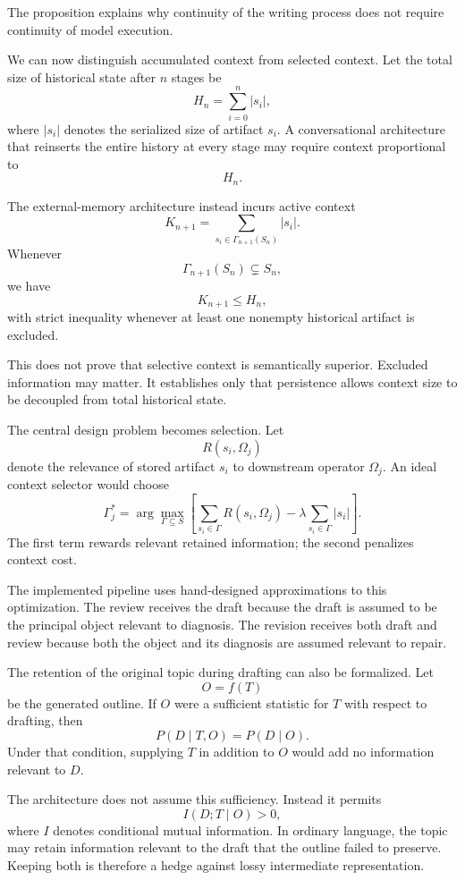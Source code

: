 \documentclass[11pt]{article}
\begin{document}
The proposition explains why continuity of the writing process does not require continuity of model execution.

We can now distinguish accumulated context from selected context. Let the total size of historical state after \(n\) stages be
\[
    H_n=\sum_{i=0}^{n}|s_i|,
\]
where \(|s_i|\) denotes the serialized size of artifact \(s_i\). A conversational architecture that reinserts the entire history at every stage may require context proportional to
\[
    H_n.
\]

The external-memory architecture instead incurs active context
\[
    K_{n+1}
    =
    \sum_{s_i\in\Gamma_{n+1}(S_n)}
    |s_i|.
\]
Whenever
\[
    \Gamma_{n+1}(S_n)\subsetneq S_n,
\]
we have
\[
    K_{n+1}\leq H_n,
\]
with strict inequality whenever at least one nonempty historical artifact is excluded.

This does not prove that selective context is semantically superior. Excluded information may matter. It establishes only that persistence allows context size to be decoupled from total historical state.

The central design problem becomes selection. Let
\[
    R(s_i,\Omega_j)
\]
denote the relevance of stored artifact \(s_i\) to downstream operator \(\Omega_j\). An ideal context selector would choose
\[
    \Gamma_j^\ast
    =
    \arg\max_{\Gamma\subseteq S}
    \left[
        \sum_{s_i\in\Gamma}
        R(s_i,\Omega_j)
        -
        \lambda
        \sum_{s_i\in\Gamma}|s_i|
    \right].
\]
The first term rewards relevant retained information; the second penalizes context cost.

The implemented pipeline uses hand-designed approximations to this optimization. The review receives the draft because the draft is assumed to be the principal object relevant to diagnosis. The revision receives both draft and review because both the object and its diagnosis are assumed relevant to repair.

The retention of the original topic during drafting can also be formalized. Let
\[
    O=f(T)
\]
be the generated outline. If \(O\) were a sufficient statistic for \(T\) with respect to drafting, then
\[
    P(D\mid T,O)=P(D\mid O).
\]
Under that condition, supplying \(T\) in addition to \(O\) would add no information relevant to \(D\).

The architecture does not assume this sufficiency. Instead it permits
\[
    I(D;T\mid O)>0,
\]
where \(I\) denotes conditional mutual information. In ordinary language, the topic may retain information relevant to the draft that the outline failed to preserve. Keeping both is therefore a hedge against lossy intermediate representation.
\end{document}
